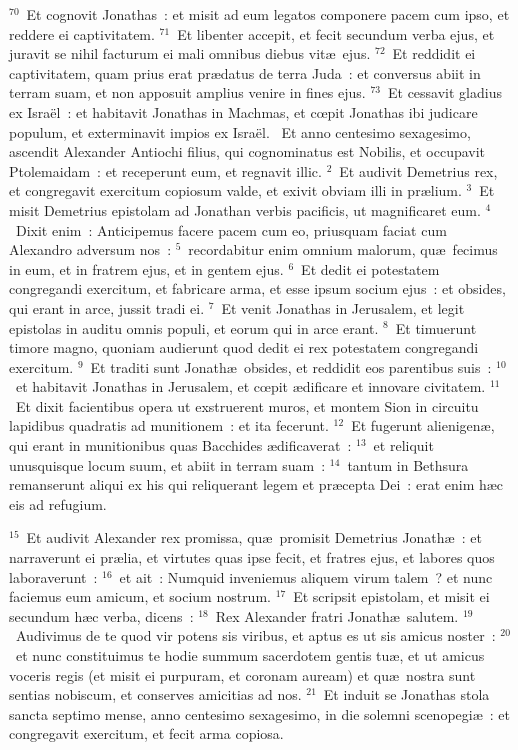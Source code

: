 ${}^{70}$~Et cognovit Jonathas~: et misit ad eum legatos componere pacem cum ipso, et reddere ei captivitatem.
${}^{71}$~Et libenter accepit, et fecit secundum verba ejus, et juravit se nihil facturum ei mali omnibus diebus vit\ae\ ejus.
${}^{72}$~Et reddidit ei captivitatem, quam prius erat pr\ae datus de terra Juda~: et conversus abiit in terram suam, et non apposuit amplius venire in fines ejus.
${}^{73}$~Et cessavit gladius ex Isra\"el~: et habitavit Jonathas in Machmas, et cœpit Jonathas ibi judicare populum, et exterminavit impios ex Isra\"el.
~Et anno centesimo sexagesimo, ascendit Alexander Antiochi filius, qui cognominatus est Nobilis, et occupavit Ptolemaidam~: et receperunt eum, et regnavit illic.
${}^{2}$~Et audivit Demetrius rex, et congregavit exercitum copiosum valde, et exivit obviam illi in pr\ae lium.
${}^{3}$~Et misit Demetrius epistolam ad Jonathan verbis pacificis, ut magnificaret eum.
${}^{4}$~Dixit enim~: Anticipemus facere pacem cum eo, priusquam faciat cum Alexandro adversum nos~:
${}^{5}$~recordabitur enim omnium malorum, qu\ae\ fecimus in eum, et in fratrem ejus, et in gentem ejus.
${}^{6}$~Et dedit ei potestatem congregandi exercitum, et fabricare arma, et esse ipsum socium ejus~: et obsides, qui erant in arce, jussit tradi ei.
${}^{7}$~Et venit Jonathas in Jerusalem, et legit epistolas in auditu omnis populi, et eorum qui in arce erant.
${}^{8}$~Et timuerunt timore magno, quoniam audierunt quod dedit ei rex potestatem congregandi exercitum.
${}^{9}$~Et traditi sunt Jonath\ae\ obsides, et reddidit eos parentibus suis~:
${}^{10}$~et habitavit Jonathas in Jerusalem, et cœpit \ae dificare et innovare civitatem.
${}^{11}$~Et dixit facientibus opera ut exstruerent muros, et montem Sion in circuitu lapidibus quadratis ad munitionem~: et ita fecerunt.
${}^{12}$~Et fugerunt alienigen\ae , qui erant in munitionibus quas Bacchides \ae dificaverat~:
${}^{13}$~et reliquit unusquisque locum suum, et abiit in terram suam~:
${}^{14}$~tantum in Bethsura remanserunt aliqui ex his qui reliquerant legem et pr\ae cepta Dei~: erat enim h\ae c eis ad refugium.


${}^{15}$~Et audivit Alexander rex promissa, qu\ae\ promisit Demetrius Jonath\ae~: et narraverunt ei pr\ae lia, et virtutes quas ipse fecit, et fratres ejus, et labores quos laboraverunt~:
${}^{16}$~et ait~: Numquid inveniemus aliquem virum talem~? et nunc faciemus eum amicum, et socium nostrum.
${}^{17}$~Et scripsit epistolam, et misit ei secundum h\ae c verba, dicens~:
${}^{18}$~Rex Alexander fratri Jonath\ae\ salutem.
${}^{19}$~Audivimus de te quod vir potens sis viribus, et aptus es ut sis amicus noster~:
${}^{20}$~et nunc constituimus te hodie summum sacerdotem gentis tu\ae , et ut amicus voceris regis (et misit ei purpuram, et coronam auream) et qu\ae\ nostra sunt sentias nobiscum, et conserves amicitias ad nos.
${}^{21}$~Et induit se Jonathas stola sancta septimo mense, anno centesimo sexagesimo, in die solemni scenopegi\ae~: et congregavit exercitum, et fecit arma copiosa.


